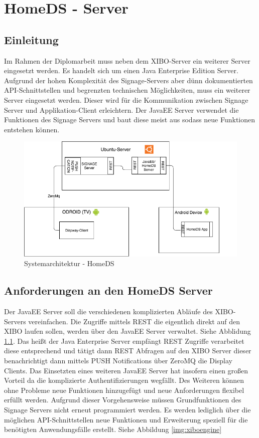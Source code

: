 \chapter{HomeDS - Server}
\section{Einleitung}\label{sec:einleitung}
Im Rahmen der Diplomarbeit muss neben dem XIBO-Server ein weiterer Server eingesetzt werden. Es handelt sich um einen Java Enterprise Edition Server. Aufgrund der hohen Komplexität des Signage-Servers aber dünn dokumentierten API-Schnittstellen und begrenzten technischen Möglichkeiten, muss ein weiterer Server eingesetzt werden. Dieser wird für die Kommunikation zwischen Signage Server und Applikation-Client erleichtern. Der JavaEE Server verwendet die Funktionen des Signage Servers und baut diese meist aus sodass neue Funktionen entstehen können.

\begin{figure}[H]
\centering
\includegraphics[width=1\textwidth]{images/08_HomeDsWeb/SystemArch.png}
\caption{Systemarchitektur - HomeDS}
\label{img:systemarchitektur}
\end{figure}
 
\section{Anforderungen an den HomeDS Server}\label{sec:homeds}
Der JavaEE Server soll die verschiedenen komplizierten Abläufe des XIBO-Servers vereinfachen. Die Zugriffe mittels REST die eigentlich direkt auf den XIBO laufen sollen, werden über den JavaEE Server verwaltet. Siehe Abblidung \ref{img:systemarchitektur}. Das heißt der Java Enterprise Server empfängt REST Zugriffe verarbeitet diese entsprechend und tätigt dann REST Abfragen auf den XIBO Server dieser benachrichtigt dann mittels PUSH Notifications über ZeroMQ die Display Clients. Das Einsetzten eines weiteren JavaEE Server hat insofern einen großen Vorteil da die komplizierte Authentifizierungen wegfällt. Des Weiteren können ohne Probleme neue Funktionen hinzugefügt und neue Anforderungen flexibel erfüllt werden. Aufgrund dieser Vorgehensweise müssen Grundfunktionen des Signage Servers nicht erneut programmiert werden. Es werden lediglich über die möglichen API-Schnittstellen neue Funktionen und Erweiterung speziell für die benötigten Anwendungsfälle erstellt. Siehe Abbildung \ref{img:xiboengine}

